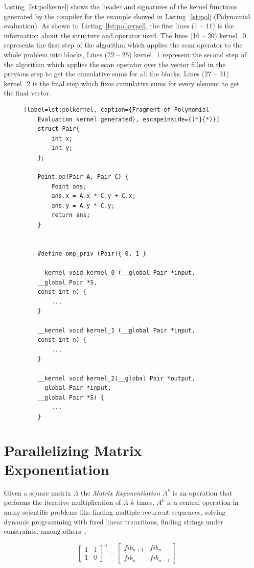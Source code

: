 \documentclass[Ingles]{ic-tese-v1}
\newcommand{\rlst}[1]{Listing~\ref{lst:#1}}
\begin{document}
\rlst{polkernel} shows the header and signatures of the kernel
functions  generated  by  the  compiler  for  the  example  showed  in
\rlst{pol} (Polynomial evaluation). As  shown in~\rlst{polkernel}, the first lines (1 -- 11) is the information
about the structure and operator used. The lines (16 -- 20) kernel\_0 represents the first step of the algorithm 
which applies the scan operator to the whole problem into blocks,
Lines (22 -- 25) kernel\_1 represent the second step of the algorithm   which  applies the scan operator
over the vector filled in the previous step to get the cumulative sums for all the blocks.
Lines (27 -- 31) kernel\_2 is the final step which fixes cumulative sums
for every element to get the final vector.

\begin{figure}[t]
	\lstset{basicstyle=\scriptsize}
	\begin{lstlisting}[label=lst:polkernel, caption={Fragment of Polynomial
	Evaluation kernel generated}, escapeinside={(*}{*)}]
	struct Pair{
		int x;
		int y;
	};

	Point op(Pair A, Pair C) {
		Point ans;
		ans.x = A.x * C.y + C.x;
		ans.y = A.y * C.y;
		return ans;
	}


	#define omp_priv (Pair){ 0, 1 }

	__kernel void kernel_0 (__global Pair *input,
	__global Pair *S,
	const int n) {
		...
	}

	__kernel void kernel_1 (__global Pair *input,
	const int n) {
		...
	}

	__kernel void kernel_2(__global Pair *output,
	__global Pair *input,
	__global Pair *S) {
		...
	}
	\end{lstlisting}
\end{figure}

\section{Parallelizing Matrix Exponentiation}
\label{sec:fibonacci}

Given a square matrix $A$ the \textit{Matrix Exponentiation} $A^k$ is an operation
that performs the iterative multiplication of $A$ $k$ times. $A^k$ is a central
operation in many scientific problems like finding multiple recurrent sequences,
solving dynamic programming with fixed linear transitions, finding strings under
constraints, among others~\cite{doi:10}.

\begin{equation}
\begin{bmatrix}1 & 1 \\ 1 & 0\end{bmatrix}^{n}
= \begin{bmatrix}fib_{n+1} & fib_{n}\\fib_{n} &
fib_{n-1}\end{bmatrix}
\label{eq:fib}
\end{equation}
\end{document}
